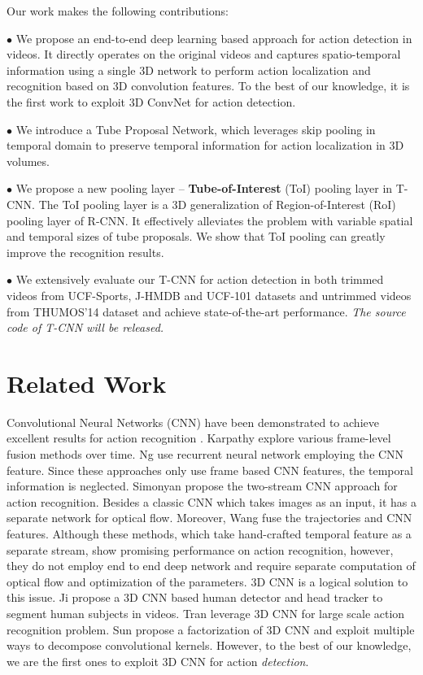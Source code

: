 \documentclass[10pt,twocolumn,letterpaper]{article}
\begin{document}
Our work makes the following contributions:







$\bullet$ We propose an end-to-end deep learning based approach for action detection in videos. It directly operates on the original videos and captures spatio-temporal information using a single 3D network to perform action localization and recognition based on 3D convolution features. To the best of our knowledge, it is the first work to exploit 3D ConvNet for action detection.

$\bullet$ We introduce a Tube Proposal Network, which leverages skip pooling in temporal domain to preserve temporal information for action localization in 3D volumes.

$\bullet$ We propose a new pooling layer -- {\bf Tube-of-Interest} (ToI) pooling layer in T-CNN. The ToI pooling layer is a 3D generalization of Region-of-Interest (RoI) pooling layer of R-CNN. It effectively alleviates the problem with variable spatial and temporal sizes of tube proposals. We show that ToI pooling can greatly improve the recognition results.

$\bullet$ We extensively evaluate our T-CNN for action detection in both trimmed videos from UCF-Sports, J-HMDB and UCF-101 datasets and untrimmed videos from THUMOS'14 dataset and achieve state-of-the-art performance. \textit{The source code of T-CNN will be released.}





\section{Related Work}\label{sec:related_work}
Convolutional Neural Networks (CNN) have been demonstrated to achieve excellent results for action recognition \cite{lecun2015deep, action_survey}. Karpathy \etal \cite{karpathy2014large}  explore various frame-level fusion methods over time. Ng \etal \cite{lstm_ng} use recurrent neural network employing the CNN feature. Since these approaches only use frame based CNN features, the temporal information is neglected. Simonyan \etal \cite{2stream_cnn_simonyan_2014two} propose the two-stream CNN approach for action recognition. Besides a classic CNN which takes images as an input, it has a separate network for optical flow. Moreover, Wang \etal fuse the trajectories and CNN features. Although these methods, which take hand-crafted temporal feature as a separate stream, show promising performance on action recognition, however, they do not employ end to end deep network and require separate computation of  optical flow  and optimization of the parameters. 3D CNN is a logical solution to this issue. Ji \etal \cite{ji20133d} propose a 3D CNN based human detector and head tracker to segment human subjects in videos. Tran \etal \cite{c3d} leverage 3D CNN for large scale action recognition problem. Sun \etal \cite{sun2015human} propose a factorization of 3D CNN and exploit multiple ways to decompose convolutional kernels. However, to the best of our knowledge, we are the first ones to exploit 3D CNN for action {\em detection}.
\end{document}
